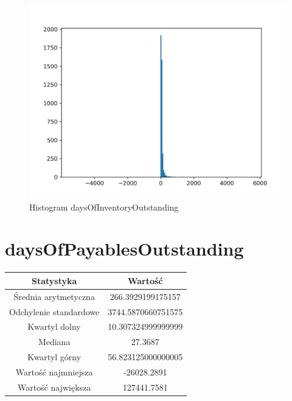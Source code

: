 \documentclass{article}
\begin{document}
\begin{figure}[h!]
    \includegraphics[width=\linewidth]{variables/daysOfInventoryOutstanding.png}
    \caption{Histogram daysOfInventoryOutstanding }
\end{figure}\section{ daysOfPayablesOutstanding }

\begin{center}
    \begin{tabular}{|c | c|} 
    \hline
    Statystyka & Wartość \\
    \hline\hline
    Średnia arytmetyczna & 266.3929199175157 \\ 
    \hline
    Odchylenie standardowe & 3744.5870660751575 \\
    \hline
    Kwartyl dolny & 10.307324999999999 \\
    \hline
    Mediana & 27.3687 \\
    \hline
    Kwartyl górny & 56.823125000000005 \\
    \hline
    Wartość najmniejsza & -26028.2891 \\
    \hline
    Wartość największa & 127441.7581 \\
    \hline
   \end{tabular}
\end{center}
\end{document}
